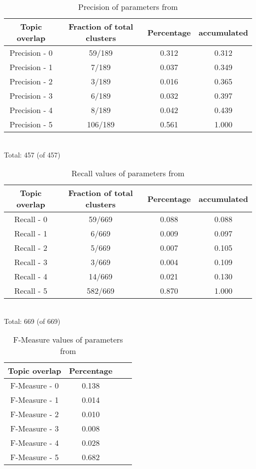 \begin{table}[H]
\begin{center}
\begin{tabular}{|c|c|c|c|}
\hline
Topic overlap &  Fraction of total clusters & Percentage  & accumulated\\ 
\hline
Precision - 0&   59/189&    0.312&   0.312\\ 
Precision - 1&    7/189&    0.037&   0.349\\ 
Precision - 2&    3/189&    0.016&   0.365\\ 
Precision - 3&    6/189&    0.032&   0.397\\ 
Precision - 4&    8/189&    0.042&   0.439\\ 
Precision - 5&   106/189&   0.561&   1.000\\ 
\hline
\end{tabular}
\\Total: 457 (of  457)
\end{center}
\caption{Precision of parameters from \citeauthor{Oren1998}}
\label{tab:etzioniparametersgroundtruth}
\end{table}


\begin{table}[H]
\begin{center}
\begin{tabular}{|c|c|c|c|}
\hline
Topic overlap &  Fraction of total clusters & Percentage  & accumulated\\ 
\hline
Recall - 0&    59/669&    0.088&   0.088\\ 
Recall - 1&     6/669&    0.009&   0.097\\ 
Recall - 2&     5/669&    0.007&   0.105\\ 
Recall - 3&     3/669&    0.004&   0.109\\ 
Recall - 4&    14/669&    0.021&   0.130\\ 
Recall - 5&    582/669&   0.870&   1.000\\ 
\hline
\end{tabular}
\\Total: 669 (of  669)
\end{center}
\caption{Recall values of parameters from \citeauthor{Oren1998}}
\label{tab:etzioniparametersgroundtruthrep}
\end{table}

\begin{table}[H]
\begin{center}
\begin{tabular}{|c|c|c|c|}
\hline
Topic overlap & Percentage\\ 
\hline
F-Measure - 0&    0.138\\ 
F-Measure - 1&    0.014\\ 
F-Measure - 2&    0.010\\ 
F-Measure - 3&    0.008\\ 
F-Measure - 4&    0.028\\ 
F-Measure - 5&    0.682\\ 
\hline
\end{tabular}
\end{center}
\caption{F-Measure values of parameters from \citeauthor{Oren1998}}
\label{tab:etzioniparametersfmeasure}
\end{table}


